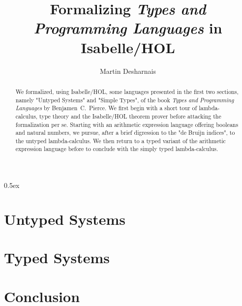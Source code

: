 \documentclass[11pt,a4paper,twoside]{report}
\begin{document}
\title{Formalizing \emph{Types and Programming Languages} in Isabelle/HOL}
\author{Martin Desharnais}

\maketitle

\begin{abstract}
We formalized, using Isabelle/HOL, some languages presented in the first two sections, namely
"Untyped Systems" and "Simple Types", of the book \emph{Types and Programming Languages} by
Benjamen~C.~Pierce. We first begin with a short tour of lambda-calculus, type theory and the
Isabelle/HOL theorem prover before attacking the formalization per se. Starting with an arithmetic
expression language offering booleans and natural numbers, we pursue, after a brief digression to
the "de Bruijn indices", to the untyped lambda-calculus. We then return to a typed variant of the
arithmetic expression language before to conclude with the simply typed lambda-calculus.
\end{abstract}

\tableofcontents

\cleardoublepage
{}
\pagestyle{headings}





\parindent 0pt\parskip 0.5ex

\part{Untyped Systems}




\part{Typed Systems}



\part{Conclusion}


%
%
\end{document}
